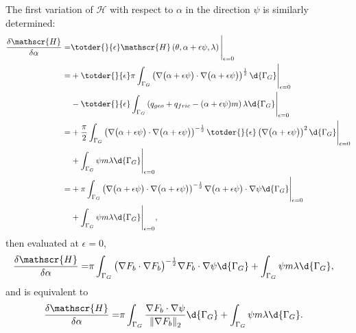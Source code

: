 The first variation of $\mathscr{H}$ with respect to $\alpha$ in the direction $\psi$ is similarly determined:
\begin{align*}
 \frac{\delta \mathscr{H}}{\delta \alpha} = &\totder{}{\epsilon} \mathscr{H} \left(\theta, \alpha + \epsilon \psi, \lambda \right) \Bigg|_{\epsilon = 0} \\
  = &+ \totder{}{\epsilon} \pi \int_{\Gamma_G} \left( \nabla \big( \alpha + \epsilon \psi \big) \cdot \nabla \big( \alpha + \epsilon \psi \big) \right)^{\frac{1}{2}} \d{\Gamma_G} \Bigg|_{\epsilon = 0} \\
  &-\totder{}{\epsilon} \int_{\Gamma_G} \left( q_{geo} + q_{fric} - (\alpha + \epsilon \psi) m \right) \lambda \d{\Gamma_G} \Bigg|_{\epsilon = 0} \\
  =&+ \frac{\pi}{2} \int_{\Gamma_G} \left( \nabla \big( \alpha + \epsilon \psi \big) \cdot \nabla \big( \alpha + \epsilon \psi \big) \right)^{-\frac{1}{2}} \totder{}{\epsilon} \left( \nabla \big( \alpha + \epsilon \psi \big) \right)^2 \d{\Gamma_G} \Bigg|_{\epsilon = 0} \\
   &+ \int_{\Gamma_G} \psi m \lambda \d{\Gamma_G} \Bigg|_{\epsilon = 0} \\
  =&+ \pi \int_{\Gamma_G} \left( \nabla \big( \alpha + \epsilon \psi \big) \cdot \nabla \big( \alpha + \epsilon \psi \big) \right)^{-\frac{1}{2}} \nabla \big( \alpha + \epsilon \psi \big) \cdot \nabla \psi \d{\Gamma_G} \Bigg|_{\epsilon = 0} \\
   &+ \int_{\Gamma_G} \psi m \lambda \d{\Gamma_G} \Bigg|_{\epsilon = 0},
\end{align*}
then evaluated at $\epsilon = 0$,
\begin{align*}
 \frac{\delta \mathscr{H}}{\delta \alpha}
  =& \pi \int_{\Gamma_G} \big( \nabla F_b \cdot \nabla F_b \big)^{-\frac{1}{2}} \nabla F_b \cdot \nabla \psi \d{\Gamma_G}
   + \int_{\Gamma_G} \psi m \lambda \d{\Gamma_G},
\end{align*}
and is equivalent to
\begin{align*}
 \frac{\delta \mathscr{H}}{\delta \alpha}
  =& \pi \int_{\Gamma_G} \frac{\nabla F_b \cdot \nabla \psi}{\left\Vert \nabla F_b \right\Vert_{2}} \d{\Gamma_G} + \int_{\Gamma_G} \psi m \lambda \d{\Gamma_G}.
\end{align*}

